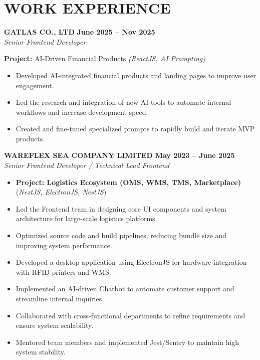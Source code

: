 \documentclass[11pt,a4paper]{article}
\begin{document}
\vspace{4pt}

\section*{WORK EXPERIENCE}

\noindent \textbf{GATLAS CO., LTD} \hfill \textbf{June 2025 -- Nov 2025} \\
\textit{Senior Frontend Developer}

\noindent \textbf{Project:} AI-Driven Financial Products \textit{(ReactJS, AI Prompting)}
\begin{itemize}
    \item Developed AI-integrated financial products and landing pages to improve user engagement.
    \item Led the research and integration of new AI tools to automate internal workflows and increase development speed.
    \item Created and fine-tuned specialized prompts to rapidly build and iterate MVP products.
\end{itemize}

\vspace{8pt}

\noindent \textbf{WAREFLEX SEA COMPANY LIMITED} \hfill \textbf{May 2023 -- June 2025} \\
\textit{Senior Frontend Developer / Technical Lead Frontend}
\begin{itemize}
    \item \textbf{Project: Logistics Ecosystem (OMS, WMS, TMS, Marketplace)} (\textit{NextJS, ElectronJS, NestJS})
    \item Led the Frontend team in designing core UI components and system architecture for large-scale logistics platforms.
    \item Optimized source code and build pipelines, reducing bundle size and improving system performance.
    \item Developed a desktop application using ElectronJS for hardware integration with RFID printers and WMS.
    \item Implemented an AI-driven Chatbot to automate customer support and streamline internal inquiries.
    \item Collaborated with cross-functional departments to refine requirements and ensure system scalability.
    \item Mentored team members and implemented Jest/Sentry to maintain high system stability.
\end{itemize}
\end{document}
